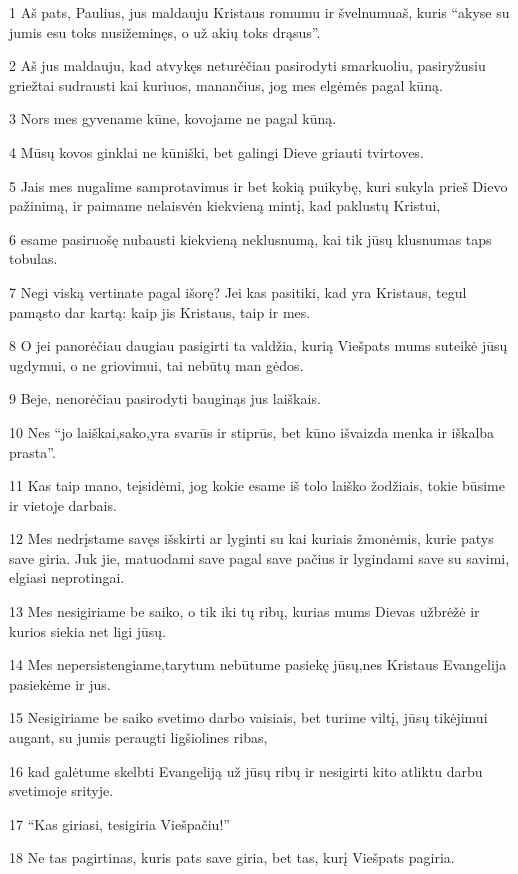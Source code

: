 \par 1 Aš pats, Paulius, jus maldauju Kristaus romumu ir švelnumu­aš, kuris “akyse su jumis esu toks nusižeminęs, o už akių toks drąsus”. 
\par 2 Aš jus maldauju, kad atvykęs neturėčiau pasirodyti smarkuoliu, pasiryžusiu griežtai sudrausti kai kuriuos, manančius, jog mes elgėmės pagal kūną. 
\par 3 Nors mes gyvename kūne, kovojame ne pagal kūną. 
\par 4 Mūsų kovos ginklai ne kūniški, bet galingi Dieve griauti tvirtoves. 
\par 5 Jais mes nugalime samprotavimus ir bet kokią puikybę, kuri sukyla prieš Dievo pažinimą, ir paimame nelaisvėn kiekvieną mintį, kad paklustų Kristui, 
\par 6 esame pasiruošę nubausti kiekvieną neklusnumą, kai tik jūsų klusnumas taps tobulas. 
\par 7 Negi viską vertinate pagal išorę? Jei kas pasitiki, kad yra Kristaus, tegul pamąsto dar kartą: kaip jis Kristaus, taip ir mes. 
\par 8 O jei panorėčiau daugiau pasigirti ta valdžia, kurią Viešpats mums suteikė jūsų ugdymui, o ne griovimui, tai nebūtų man gėdos. 
\par 9 Beje, nenorėčiau pasirodyti bauginąs jus laiškais. 
\par 10 Nes “jo laiškai,­sako,­yra svarūs ir stiprūs, bet kūno išvaizda menka ir iškalba prasta”. 
\par 11 Kas taip mano, teįsidėmi, jog kokie esame iš tolo laiško žodžiais, tokie būsime ir vietoje darbais. 
\par 12 Mes nedrįstame savęs išskirti ar lyginti su kai kuriais žmonėmis, kurie patys save giria. Juk jie, matuodami save pagal save pačius ir lygindami save su savimi, elgiasi neprotingai. 
\par 13 Mes nesigiriame be saiko, o tik iki tų ribų, kurias mums Dievas užbrėžė ir kurios siekia net ligi jūsų. 
\par 14 Mes nepersistengiame,­tarytum nebūtume pasiekę jūsų,­nes Kristaus Evangelija pasiekėme ir jus. 
\par 15 Nesigiriame be saiko svetimo darbo vaisiais, bet turime viltį, jūsų tikėjimui augant, su jumis peraugti ligšiolines ribas, 
\par 16 kad galėtume skelbti Evangeliją už jūsų ribų ir nesigirti kito atliktu darbu svetimoje srityje. 
\par 17 “Kas giriasi, tesigiria Viešpačiu!” 
\par 18 Ne tas pagirtinas, kuris pats save giria, bet tas, kurį Viešpats pagiria.



